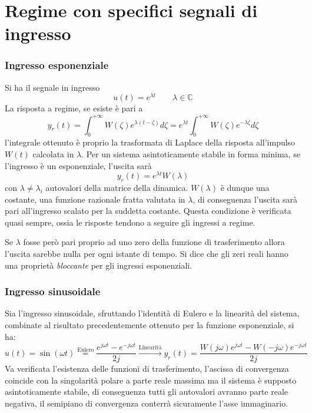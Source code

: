 
\section{Regime con specifici segnali di ingresso}
\subsubsection{Ingresso esponenziale}
Si ha il segnale in ingresso
$$
u(t) = e^{\lambda t}\qquad \lambda\in\mathbb{C}
$$
La risposta a regime, se esiste è pari a
$$
y_r(t) = \int_0^{+\infty} W(\zeta) e^{\lambda(t-\zeta)} d\zeta = e^{\lambda t}
\int_0^{+\infty} W(\zeta)e^{-\lambda \zeta}
d\zeta
$$
l'integrale ottenuto è proprio la trasformata di Laplace della risposta
all'impulso $W(t)$ calcolata in $\lambda$. Per un sistema asintoticamente
stabile in forma minima, se l'ingresso è un esponenziale, l'uscita sarà
$$
y_r(t) = e^{\lambda t} W(\lambda)
$$
con $\lambda \neq \lambda_i$ autovalori della matrice della dinamica.
$W(\lambda)$ è dunque una costante, una funzione razionale fratta valutata in
$\lambda$, di conseguenza l'uscita sarà pari all'ingresso scalato per la
suddetta costante.
Questa condizione è verificata quasi sempre, ossia le risposte tendono a
seguire gli ingressi a regime.

Se $\lambda$ fosse però pari proprio ad uno zero della funzione di
trasferimento allora l'uscita sarebbe nulla per ogni istante di tempo.
Si dice che gli zeri reali hanno una proprietà \textit{bloccante} per gli
ingressi esponenziali.

\subsubsection{Ingresso sinusoidale}
Sia l'ingresso sinusoidale, sfruttando l'identità di Eulero e la linearità del
sistema, combinate al risultato precedentemente ottenuto per la funzione
esponenziale, si ha:
\begin{equation}
u(t) = \sin(\omega t) \stackrel{\text{Eulero}}{=} \frac{e^{j\omega
t}-e^{-j\omega t}}{2j}\stackrel{\text{Linearità}}{\longrightarrow} y_r(t) =
\frac{W(j\omega)e^{j\omega t} - W(-j\omega)e^{-j\omega t}}{2j}
\label{eq:risposta_sinusoidale}
\end{equation}
Va verificata l'esistenza delle funzioni di trasferimento, l'ascissa di
convergenza coincide con la singolarità polare a parte reale massima ma il
sistema è supposto asintoticamente stabile, di conseguenza tutti gli autovalori
avranno parte reale negativa, il semipiano di convergenza conterrà sicuramente
l'asse immaginario.

